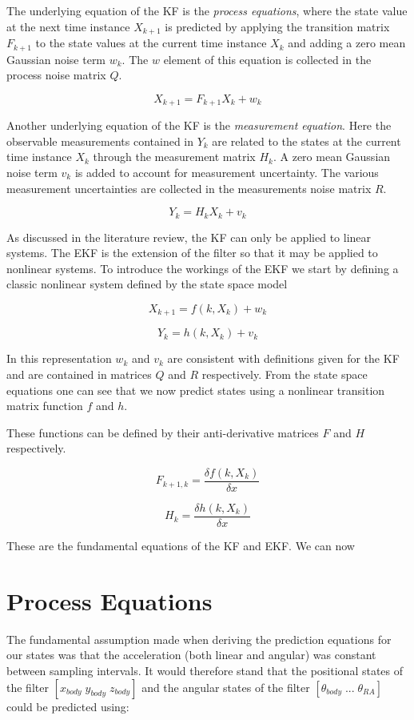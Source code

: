 The underlying equation of the KF is the \textit{process equations}, where the state value at the next time instance $ X_{k+1} $ is predicted by applying the transition matrix $ F_{k+1} $ to the state values at the current time instance $ X_{k} $ and adding a zero mean Gaussian noise term $ w_{k} $. The $ w $ element of this equation is collected in the process noise matrix $ Q $. 

$$ X_{k+1} = F_{k+1}X_{k} + w_{k}  $$

Another underlying equation of the KF is the \textit{measurement equation}. Here the observable measurements contained in $ Y_k $ are related to the states at the current time instance $ X_{k} $ through the measurement matrix $ H_{k} $. A zero mean Gaussian noise term $ v_{k} $ is added to account for measurement uncertainty. The various measurement uncertainties are collected in the measurements noise matrix $ R $. 

$$ Y_k = H_{k}X_{k} + v_{k} $$


As discussed in the literature review, the KF can only be applied to linear systems. The EKF is the extension of the filter so that it may be applied to nonlinear systems. To introduce the workings of the EKF we start by defining a classic nonlinear system defined by the state space model

$$ X_{k+1} = f(k,X_{k}) + w_{k}  $$

$$ Y_k = h(k,X_{k}) + v_{k} $$

In this representation $ w_{k} $ and $ v_{k} $ are consistent with definitions given for the KF and are contained in matrices $ Q $ and $ R $ respectively. From the state space equations one can see that we now predict states using a nonlinear transition matrix function $ f $ and $ h $.

These functions can be defined by their anti-derivative matrices $F$ and $H$ respectively.

$$ F_{k+1,k} = \frac{\delta f(k,X_{k})}{\delta x} $$

$$ H_{k} = \frac{\delta h(k,X_{k})}{\delta x} $$

These are the fundamental equations of the KF and EKF. We can now 

\section{Process Equations}
The fundamental assumption made when deriving the prediction equations for our states was that the acceleration (both linear and angular) was constant between sampling intervals. It would therefore stand that the positional states of the filter $[x_{body} \; y_{body} \; z_{body}]$ and the angular states of the filter $[\theta_{body} \; ... \; \theta_{RA}]$ could be predicted using: 


